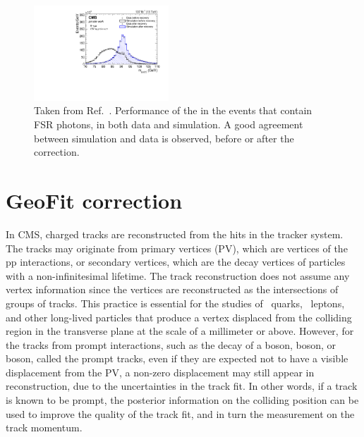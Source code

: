 \begin{figure}[!htb]
      \centering
      \captionsetup{justification=justified}
      \includegraphics[width=0.45\textwidth]{pics/muon_corr/FSR/FSRrecovery_Validation.pdf}
      \caption{Taken from Ref.~\cite{oliverthesis}.
               Performance of the \FSR in the \zmm events that contain FSR photons, in both data and simulation. 
               A good agreement between simulation and data is observed, before or after the correction.}
      \label{fig:fsr_val}
\end{figure}


\section{GeoFit correction} \label{sec:GeoFit}

In CMS, charged tracks are reconstructed from the hits in the tracker system.
The tracks may originate from primary vertices (PV), which are vertices of the pp interactions,
or secondary vertices, which are the decay vertices of particles with a non-infinitesimal lifetime.
The track reconstruction does not assume any vertex information since the vertices are reconstructed as the intersections of groups of tracks.
This practice is essential for the studies of \Pqb ~quarks, \tau ~leptons, 
and other long-lived particles that produce a vertex displaced from the colliding region in the transverse plane at the scale of a millimeter or above.
However, for the tracks from prompt interactions, such as the decay of a \PZ boson, \PW boson, or \PH boson,
called the prompt tracks, even if they are expected not to have a visible displacement from the PV, 
a non-zero displacement may still appear in reconstruction, due to the uncertainties in the track fit.
In other words, if a track is known to be prompt, the posterior information on the colliding position 
can be used to improve the quality of the track fit, and in turn the measurement on the track momentum.

